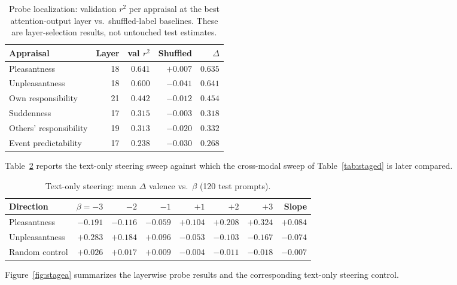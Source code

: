 \documentclass{article}
\begin{document}
\begin{table}[h]
  \caption{Probe localization: validation $r^2$ per appraisal at the best attention-output layer vs.\ shuffled-label baselines. These are layer-selection results, not untouched test estimates.}
  \label{tab:stagea}
  \centering
  \small
  \begin{tabular}{lrrrr}
    \toprule
    Appraisal & Layer & val $r^2$ & Shuffled & $\Delta$ \\
    \midrule
    Pleasantness           & 18 & $0.641$ & $+0.007$ & $0.635$ \\
    Unpleasantness         & 18 & $0.600$ & $-0.041$ & $0.641$ \\
    Own responsibility     & 21 & $0.442$ & $-0.012$ & $0.454$ \\
    Suddenness             & 17 & $0.315$ & $-0.003$ & $0.318$ \\
    Others' responsibility & 19 & $0.313$ & $-0.020$ & $0.332$ \\
    Event predictability   & 17 & $0.238$ & $-0.030$ & $0.268$ \\
    \bottomrule
  \end{tabular}
\end{table}

Table~\ref{tab:steertext} reports the text-only steering sweep against which the cross-modal sweep of Table~\ref{tab:staged} is later compared.

\begin{table}[h]
  \caption{Text-only steering: mean $\Delta$ valence vs.\ $\beta$ (120 test prompts).}
  \label{tab:steertext}
  \centering
  \small
  \begin{tabular}{lrrrrrrr}
    \toprule
    Direction & $\beta{=}{-}3$ & $-2$ & $-1$ & $+1$ & $+2$ & $+3$ & Slope \\
    \midrule
    Pleasantness   & $-0.191$ & $-0.116$ & $-0.059$ & $+0.104$ & $+0.208$ & $+0.324$ & $+0.084$ \\
    Unpleasantness & $+0.283$ & $+0.184$ & $+0.096$ & $-0.053$ & $-0.103$ & $-0.167$ & $-0.074$ \\
    Random control & $+0.026$ & $+0.017$ & $+0.009$ & $-0.004$ & $-0.011$ & $-0.018$ & $-0.007$ \\
    \bottomrule
  \end{tabular}
\end{table}

Figure~\ref{fig:stagea} summarizes the layerwise probe results and the corresponding text-only steering control.
\end{document}
